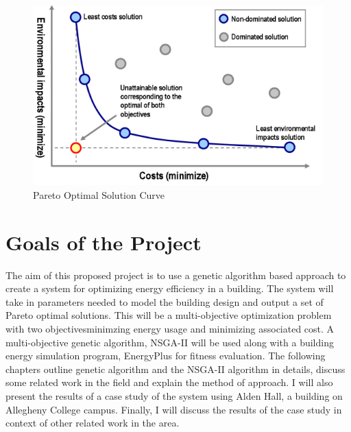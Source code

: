 \begin{figure}[htbp]
\centering
\includegraphics[width = 0.5\linewidth]{images/pareto.png}
\caption{Pareto Optimal Solution Curve \cite{Coley2002}}
\label{fig:pareto}
\end{figure}

\section{Goals of the Project}\label{sec:goals}

The aim of this proposed project is to use a genetic algorithm based approach 
to create a system for optimizing energy efficiency in a building. The system 
will take in parameters needed to model the building design and output a set of Pareto optimal solutions. This will be a multi-objective optimization problem with two objectives\textemdash minimzing energy usage and minimizing associated cost. A multi-objective genetic algorithm, NSGA-II will be used along with a building energy simulation program, EnergyPlus for fitness evaluation. The following chapters outline genetic algorithm and the NSGA-II algorithm in details, discuss some related work in the field and explain the method of approach. I will also present the results of a case study of the system using Alden Hall, a building on Allegheny College campus. Finally, I will discuss the results of the case study in context of other related work in the area.



